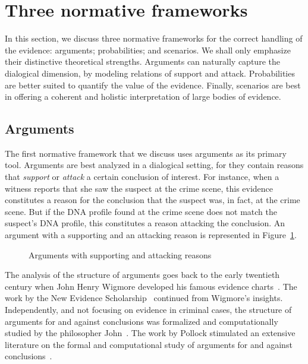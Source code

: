 \documentclass[10pt]{article}
\begin{document}
\section{Three normative frameworks}
\label{sec:frameworks}

In this section, we discuss three normative frameworks for the correct handling of the evidence: 
arguments; probabilities; and scenarios. %
We shall only emphasize their distinctive theoretical strengths. Arguments can naturally 
capture the dialogical dimension, by modeling relations of support and attack. 
Probabilities are better suited to quantify the value of the evidence. Finally, scenarios are 
best in offering a coherent and holistic interpretation 
of large bodies of evidence. 


\subsection{Arguments}

The first normative framework %
that we discuss uses arguments as its primary tool. 
Arguments are best analyzed in a dialogical setting, for they 
contain reasons that \textit{support} or \textit{attack} a certain conclusion of interest. For instance, when a witness reports that 
she saw the suspect at the crime scene, this evidence constitutes a reason for the conclusion that 
the suspect was, in fact, at the crime scene. But if the DNA profile found at the crime scene 
does not match the suspect's DNA profile, this constitutes 
a reason attacking the conclusion. An argument with a supporting and 
an attacking reason is represented in Figure~\ref{fig:arg}.

\begin{figure}[bt]
\centering

\caption{Arguments with supporting and attacking reasons\label{fig:arg}}
\end{figure}


The analysis of the structure of arguments goes back to the early twentieth century when John Henry Wigmore developed his famous evidence charts~\citep{wigmore1913,wigmore1931}. The work by the New Evidence Scholarship~\citep{andersonEtal2005} continued from Wigmore's insights. Independently, and not focusing on evidence in criminal cases, the structure of arguments for and against conclusions was formalized and computationally studied by the philosopher John~\citet{pollock1987,pollock1995}. The work by Pollock stimulated an extensive literature on the formal and computational study of arguments for and against conclusions~\citep{vanEemerenEtal2014Ch11}.
\end{document}
